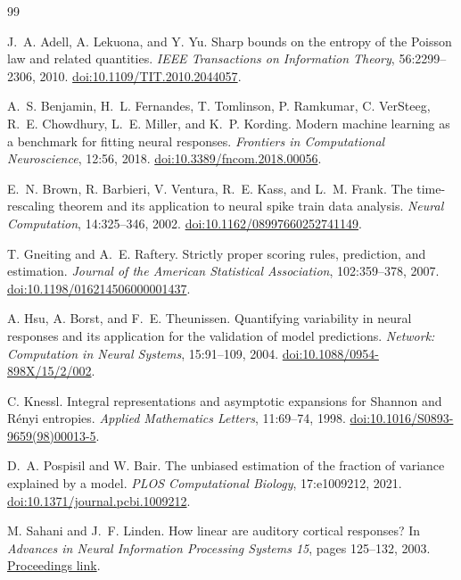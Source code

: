 \documentclass[11pt]{article}
\begin{document}
\begin{thebibliography}{99}

J.~A. Adell, A. Lekuona, and Y. Yu.
Sharp bounds on the entropy of the Poisson law and related quantities.
\emph{IEEE Transactions on Information Theory}, 56:2299--2306, 2010.
\href{https://doi.org/10.1109/TIT.2010.2044057}{doi:10.1109/TIT.2010.2044057}.

A.~S. Benjamin, H.~L. Fernandes, T. Tomlinson, P. Ramkumar, C. VerSteeg, R.~E. Chowdhury, L.~E. Miller, and K.~P. Kording.
Modern machine learning as a benchmark for fitting neural responses.
\emph{Frontiers in Computational Neuroscience}, 12:56, 2018.
\href{https://doi.org/10.3389/fncom.2018.00056}{doi:10.3389/fncom.2018.00056}.

E.~N. Brown, R. Barbieri, V. Ventura, R.~E. Kass, and L.~M. Frank.
The time-rescaling theorem and its application to neural spike train data analysis.
\emph{Neural Computation}, 14:325--346, 2002.
\href{https://doi.org/10.1162/08997660252741149}{doi:10.1162/08997660252741149}.

T. Gneiting and A.~E. Raftery.
Strictly proper scoring rules, prediction, and estimation.
\emph{Journal of the American Statistical Association}, 102:359--378, 2007.
\href{https://doi.org/10.1198/016214506000001437}{doi:10.1198/016214506000001437}.

A. Hsu, A. Borst, and F.~E. Theunissen.
Quantifying variability in neural responses and its application for the validation of model predictions.
\emph{Network: Computation in Neural Systems}, 15:91--109, 2004.
\href{https://doi.org/10.1088/0954-898X/15/2/002}{doi:10.1088/0954-898X/15/2/002}.

C. Knessl.
Integral representations and asymptotic expansions for Shannon and R\'enyi entropies.
\emph{Applied Mathematics Letters}, 11:69--74, 1998.
\href{https://doi.org/10.1016/S0893-9659(98)00013-5}{doi:10.1016/S0893-9659(98)00013-5}.

D.~A. Pospisil and W. Bair.
The unbiased estimation of the fraction of variance explained by a model.
\emph{PLOS Computational Biology}, 17:e1009212, 2021.
\href{https://doi.org/10.1371/journal.pcbi.1009212}{doi:10.1371/journal.pcbi.1009212}.

M. Sahani and J.~F. Linden.
How linear are auditory cortical responses?
In \emph{Advances in Neural Information Processing Systems 15}, pages 125--132, 2003.
\href{https://proceedings.neurips.cc/paper/2002/hash/229754d7799160502a143a72f6789927-Abstract.html}{Proceedings link}.


\end{thebibliography}
\end{document}
